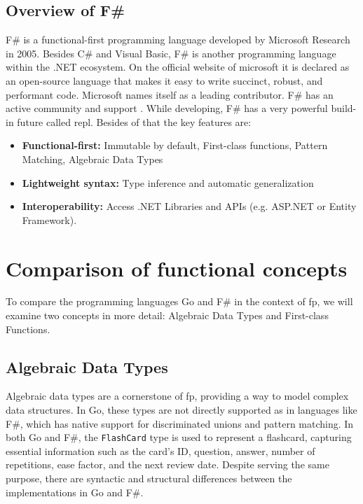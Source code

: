     \section{Overview of F\#}\label{sec:fsharp-overview}
    F\# is a functional-first programming language developed by Microsoft Research in 2005.
    Besides C\# and Visual Basic, F\# is another programming language within the .NET ecosystem. On the official website of microsoft it is declared as an open-source language that makes it easy to write succinct, robust, and performant code. Microsoft names itself as a leading contributor. F\# has an active community and support \cite{fsharpfoundation}.
    While developing, F\# has a very powerful build-in future called \ac{repl}. Besides of that the key features are:
    \begin{itemize}
        \item \textbf{Functional-first:} Immutable by default, First-class functions, Pattern Matching, Algebraic Data Types 
        \item \textbf{Lightweight syntax:} Type inference and automatic generalization
        \item \textbf{Interoperability:} Access .NET Libraries and APIs (e.g. ASP.NET or Entity Framework). 
    \end{itemize}
    \cite{dotnet}
    \cite{keyfeaturesfsharp}
    


\chapter{Comparison of functional concepts}\label{chap:comparison}
To compare the programming languages Go and F\# in the context of \ac{fp}, we will examine two concepts in more detail: Algebraic Data Types and First-class Functions. 

    \section{Algebraic Data Types}\label{sec:algebraic-data-types}

    Algebraic data types are a cornerstone of \ac{fp}, providing a way to model complex data structures. In Go, these types are not directly supported as in languages like F\#, which has native support for discriminated unions and pattern matching. In both Go and F\#, the \texttt{FlashCard} type is used to represent a flashcard, capturing essential information such as the card's ID, question, answer, number of repetitions, ease factor, and the next review date. Despite serving the same purpose, there are syntactic and structural differences between the implementations in Go and F\#.

